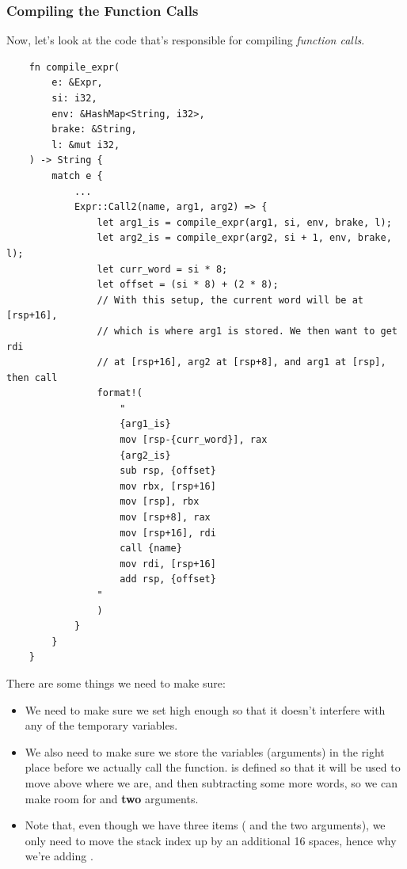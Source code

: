 \documentclass[letterpaper]{article}
\begin{document}
\subsubsection{Compiling the Function Calls}
Now, let's look at the code that's responsible for compiling \emph{function calls}.
\begin{verbatim}
    fn compile_expr(
        e: &Expr,
        si: i32,
        env: &HashMap<String, i32>,
        brake: &String,
        l: &mut i32,
    ) -> String {
        match e {
            ...
            Expr::Call2(name, arg1, arg2) => {
                let arg1_is = compile_expr(arg1, si, env, brake, l);
                let arg2_is = compile_expr(arg2, si + 1, env, brake, l);
                let curr_word = si * 8;
                let offset = (si * 8) + (2 * 8);
                // With this setup, the current word will be at [rsp+16], 
                // which is where arg1 is stored. We then want to get rdi
                // at [rsp+16], arg2 at [rsp+8], and arg1 at [rsp], then call
                format!(
                    "
                    {arg1_is}
                    mov [rsp-{curr_word}], rax
                    {arg2_is}
                    sub rsp, {offset}
                    mov rbx, [rsp+16]
                    mov [rsp], rbx
                    mov [rsp+8], rax
                    mov [rsp+16], rdi
                    call {name}
                    mov rdi, [rsp+16]
                    add rsp, {offset}
                "
                )
            }
        }
    }\end{verbatim}
There are some things we need to make sure: 
\begin{itemize}
    \item We need to make sure we set  high enough so that it doesn't interfere with any of the temporary variables. 
    \item We also need to make sure we store the variables (arguments) in the right place before we actually call the function.  is defined so that it will be used to move  above where we are, and then subtracting some more words, so we can make room for  and \textbf{two} arguments. 
    \item Note that, even though we have three items ( and the two arguments), we only need to move the stack index up by an additional 16 spaces, hence why we're adding . %
\end{itemize}
\end{document}
